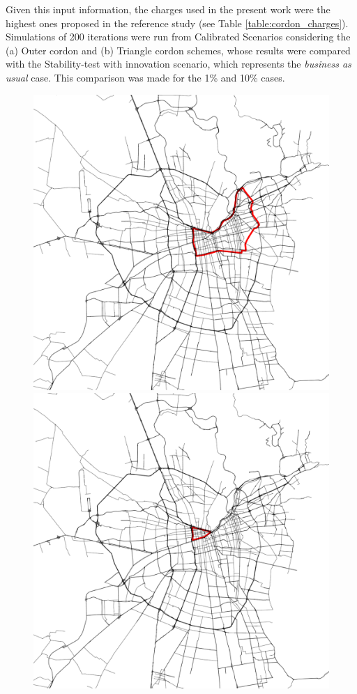 \documentclass[Journal,letterpaper]{ascelike-new}
\begin{document}
Given this input information, the charges used in the present work were the highest ones proposed in the reference study (see Table \ref{table:cordon_charges}). Simulations of 200 iterations were run from Calibrated Scenarios considering the (a) Outer cordon and (b) Triangle cordon schemes, whose results were compared with the Stability-test with innovation scenario, which represents the \emph{business as usual} case. This comparison was made for the 1\% and 10\% cases.

\begin{figure}[h!]
	\centering
	\includegraphics[scale=0.22]{images/outerCordon.pdf}\hspace{3cm}
	\includegraphics[scale=0.22]{images/triangleCordon.pdf}

\end{figure}
\end{document}
